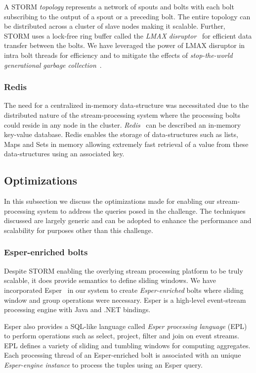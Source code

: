 \documentclass{sig-alternate}
\begin{document}
 A STORM {\it topology} represents a network of spouts and bolts with each bolt subscribing to the output of a spout or a preceding bolt. The entire topology can be distributed across a cluster of slave nodes making it scalable. Further, STORM uses a lock-free ring buffer called the {\it LMAX disruptor}~\cite{lmax} for efficient data transfer between the bolts. We have leveraged the power of LMAX disruptor in intra bolt threads for efficiency and to mitigate the effects of {\it stop-the-world generational garbage collection}~\cite{sun}.


\subsubsection{Redis}
\label{sub:redis}
The need for a centralized in-memory data-structure was necessitated due to the distributed nature of the  stream-processing system where the processing bolts could reside in any node in the cluster. {\it Redis}~\cite{redis} can be described an in-memory key-value database. Redis enables the storage of data-structures such as lists, Maps and Sets in memory allowing extremely fast retrieval of a value from these data-structures using an associated key.


\subsection{Optimizations}
\label{sec:optimizations}
In this subsection we discuss the optimizations made for enabling our stream-processing system to address the queries posed in the challenge. The techniques discussed are largely generic and can be adopted to enhance the performance and scalability for purposes other than this challenge.


\subsubsection{Esper-enriched bolts}
\label{sub:esper}
Despite STORM enabling the overlying stream processing platform to be truly scalable, it does provide semantics to define sliding windows. We have incorporated Esper~\cite{esper} in our system to create {\it Esper-enriched} bolts where sliding window and group operations were necessary. Esper is a high-level event-stream processing engine with Java and .NET bindings. 

Esper also provides a SQL-like language called {\it Esper processing language} (EPL) to perform operations such as select, project, filter and join on event streams. EPL  defines a variety of sliding and tumbling windows for computing aggregates. Each processing thread of an Esper-enriched bolt is associated with an unique {\it Esper-engine instance} to process the tuples using an Esper query.
 
\end{document}
